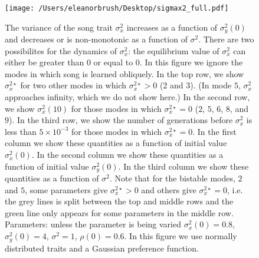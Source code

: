 \documentclass{article}
\begin{document}
\begin{figure}
\texttt{[image: /Users/eleanorbrush/Desktop/sigmax2\_full.pdf]}
\caption{\label{sigmax2_full} The variance of the song trait $\sigma_x^{2}$ increases as a function of $\sigma_y^2(0)$ and decreases or is non-monotonic as a function of $\sigma^2$. There are two possibilites for the dynamics of $\sigma_x^2$: the equilibrium value of $\sigma_x^2$ can either be greater than $0$ or equal to $0$. In this figure we ignore the modes in which song is learned obliquely. In the top row, we show $\sigma_x^{2\star}$ for two other modes in which $\sigma_x^{2\star}>0$ ($2$ and $3$). (In mode $5$, $\sigma_x^2$ approaches infinity, which we do not show here.) In the second row, we show $\sigma_x^2(10)$  for those modes in which $\sigma_x^{2\star}=0$ ($2$, $5$, $6$, $8$, and $9$). In the third row, we show the number of generations before $\sigma_x^2$ is less than $5\times10^{-3}$ for those modes in which $\sigma_x^{2\star}=0$. In the first column we show these quantities as a function of initial value $\sigma_x^{2}(0)$. In the second column we show these quantities as a function of initial value $\sigma_y^2(0)$. In the third column we show these quantities as a function of $\sigma^2$. Note that for the bistable modes, $2$ and $5$, some parameters give $\sigma_x^{2\star}>0$ and others give $\sigma_x^{2\star}=0$, i.e. the grey lines is split between the top and middle rows and the green line only appears for some parameters in the middle row. Parameters: unless the parameter is being varied $\sigma_x^2(0)=0.8$, $\sigma_y^2(0)=4$, $\sigma^2=1$, $\rho(0)=0.6$. In this figure we use normally distributed traits and a Gaussian preference function. } 
\end{figure}
\end{document}
